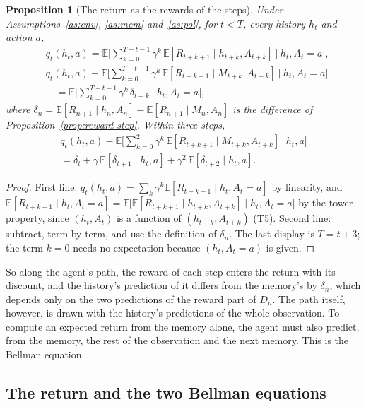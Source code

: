 \documentclass{article}
\newtheorem{proposition}{Proposition}[section]
\theoremstyle{definition}
\theoremstyle{remark}
\newcommand{\E}{\mathbb{E}}
\begin{document}
\begin{proposition}[The return as the rewards of the steps]\label{prop:return-steps}
Under Assumptions~\ref{as:env}, \ref{as:mem} and~\ref{as:pol}, for $t<T$, every history $h_t$ and action $a$,
\begin{align*}
&q_t(h_t,a)=\E\Big[\sum_{k=0}^{T-t-1}\gamma^k\,\E[R_{t+k+1}\mid h_{t+k},A_{t+k}]\ \Big|\ h_t,A_t=a\Big],\\
&q_t(h_t,a)-\E\Big[\sum_{k=0}^{T-t-1}\gamma^k\,\E[R_{t+k+1}\mid M_{t+k},A_{t+k}]\ \Big|\ h_t,A_t=a\Big]\\
&\quad=\E\Big[\sum_{k=0}^{T-t-1}\gamma^k\,\delta_{t+k}\ \Big|\ h_t,A_t=a\Big],
\end{align*}
where $\delta_n=\E[R_{n+1}\mid h_n,A_n]-\E[R_{n+1}\mid M_n,A_n]$ is the difference of Proposition~\ref{prop:reward-step}. Within three steps,
\begin{multline*}
q_t(h_t,a)-\E\big[\textstyle\sum_{k=0}^{2}\gamma^k\,\E[R_{t+k+1}\mid M_{t+k},A_{t+k}]\,\big|\,h_t,a\big]\\=\delta_t+\gamma\,\E[\delta_{t+1}\mid h_t,a]+\gamma^2\,\E[\delta_{t+2}\mid h_t,a].
\end{multline*}
\end{proposition}

\begin{proof}
First line: $q_t(h_t,a)=\sum_k\gamma^k\E[R_{t+k+1}\mid h_t,A_t=a]$ by linearity, and $\E[R_{t+k+1}\mid h_t,A_t=a]=\E\big[\E[R_{t+k+1}\mid h_{t+k},A_{t+k}]\mid h_t,A_t=a\big]$ by the tower property, since $(h_t,A_t)$ is a function of $(h_{t+k},A_{t+k})$ (T5). Second line: subtract, term by term, and use the definition of $\delta_n$. The last display is $T=t+3$; the term $k=0$ needs no expectation because $(h_t,A_t=a)$ is given.
\end{proof}

So along the agent's path, the reward of each step enters the return with its discount, and the history's prediction of it differs from the memory's by $\delta_n$, which depends only on the two predictions of the reward part of $D_n$. The path itself, however, is drawn with the history's predictions of the whole observation. To compute an expected return from the memory alone, the agent must also predict, from the memory, the rest of the observation and the next memory. This is the Bellman equation.

\subsection{The return and the two Bellman equations}
\end{document}
